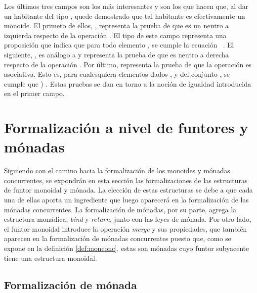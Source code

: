 Los últimos tres campos son los más interesantes y son los que hacen que, al dar un habitante del tipo , quede demostrado que tal habitante es efectivamente un monoide. El primero de ellos, , representa la prueba de que  es un neutro a izquierda respecto de la operación . El tipo de este campo representa una proposición que indica que para todo elemento , se cumple la ecuación \hbox{\AgdaSymbol{(}  \AgdaSymbol{)}  }. El siguiente, , es análogo a  y representa la prueba de que  es neutro a derecha respecto de la operación . Por último,  representa la prueba de que la operación  es asociativa. Esto es, para cualesquiera elementos dados ,  y  del conjunto , se cumple que \AgdaSymbol{(}  \AgdaSymbol{(}  \AgdaSymbol{))}  \AgdaSymbol{((}  \AgdaSymbol)  \AgdaSymbol{)}. Estas pruebas se dan en torno a la noción de igualdad introducida en el primer campo.

\section{Formalización a nivel de funtores y mónadas}\label{form:funtmon}

Siguiendo con el camino hacia la formalización de los monoides y mónadas concurrentes, se expondrán en esta sección las formalizaciones de las estructuras de funtor monoidal y mónada. La elección de estas estructuras se debe a que cada una de ellas aporta un ingrediente que luego aparecerá en la formalización de las mónadas concurrentes. La formalización de mónadas, por su parte, agrega la estructura monádica, \textit{bind} y \textit{return}, junto con las leyes de mónada. Por otro lado, el funtor monoidal introduce la operación \textit{merge} y sus propiedades, que también aparecen en la formalización de mónadas concurrentes puesto que, como se expone en la definición \ref{def:monconc}, estas son mónadas cuyo funtor subyacente tiene una estructura monoidal.

\subsection{Formalización de mónada}\label{funtmon:mon}

